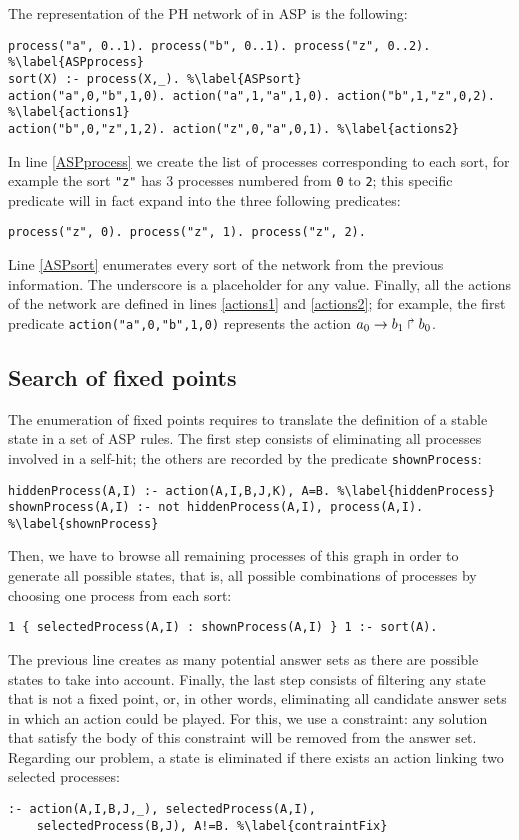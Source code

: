 \begin{example}
\label{ex:asp-ph}
The representation of the PH network of  in ASP is the following:
\begin{lstlisting}
process("a", 0..1). process("b", 0..1). process("z", 0..2). %\label{ASPprocess}
sort(X) :- process(X,_). %\label{ASPsort}
action("a",0,"b",1,0). action("a",1,"a",1,0). action("b",1,"z",0,2). %\label{actions1}
action("b",0,"z",1,2). action("z",0,"a",0,1). %\label{actions2}
\end{lstlisting}
In line \ref{ASPprocess} we create the list of processes corresponding to each sort,
for example the sort \texttt{"z"} has 3 processes numbered from \texttt{0} to \texttt{2};
this specific predicate will in fact expand into the three following predicates:
\begin{lstlisting}[numbers=none]
process("z", 0). process("z", 1). process("z", 2).
\end{lstlisting}
Line \ref{ASPsort} enumerates every sort of the network from the previous information.
The underscore is a placeholder for any value.
Finally, all the actions of the network are defined in lines \ref{actions1} and \ref{actions2};
for example, the first predicate \texttt{action("a",0,"b",1,0)} represents the action
$a_0\rightarrow b_1\Rsh b_0$.
\end{example}

\subsection{Search of fixed points}

The enumeration of fixed points requires to translate the definition of a stable state
in a set of ASP rules.
The first step consists of eliminating all processes involved in a self-hit;
the others are recorded by the predicate \texttt{shownProcess}:
\begin{lstlisting}
hiddenProcess(A,I) :- action(A,I,B,J,K), A=B. %\label{hiddenProcess}
shownProcess(A,I) :- not hiddenProcess(A,I), process(A,I). %\label{shownProcess}
\end{lstlisting}
Then, we have to browse all remaining processes of this graph
in order to generate all possible states,
that is, all possible combinations of processes by choosing one process from each sort:
\begin{lstlisting}
1 { selectedProcess(A,I) : shownProcess(A,I) } 1 :- sort(A).
\end{lstlisting}
The previous line creates as many potential answer sets as there are possible states
to take into account.
Finally, the last step consists of filtering any state that is not a fixed point,
or, in other words, eliminating all candidate answer sets in which an action could be played.
For this, we use a constraint:
any solution that satisfy the body of this constraint will be removed from the answer set.
Regarding our problem, a state is eliminated if there exists an action linking two selected processes:
\begin{lstlisting}
:- action(A,I,B,J,_), selectedProcess(A,I),
    selectedProcess(B,J), A!=B. %\label{contraintFix}
\end{lstlisting}

